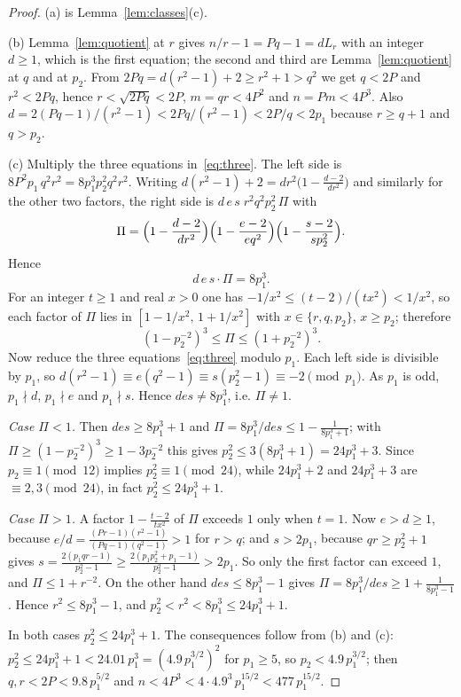 \documentclass[11pt]{amsart}
\theoremstyle{definition}
\theoremstyle{remark}
\begin{document}
\begin{proof}
(a) is Lemma~\ref{lem:classes}(c).

(b) Lemma~\ref{lem:quotient} at $r$ gives $n/r-1=Pq-1=dL_r$ with an integer $d\ge1$, which is the first equation; the second and third are Lemma~\ref{lem:quotient} at $q$ and at $p_2$. From $2Pq=d(r^2-1)+2\ge r^2+1>q^2$ we get $q<2P$ and $r^2<2Pq$, hence $r<\sqrt{2Pq}<2P$, $m=qr<4P^2$ and $n=Pm<4P^3$. Also $d=2(Pq-1)/(r^2-1)<2Pq/(r^2-1)<2P/q<2p_1$ because $r\ge q+1$ and $q>p_2$.

(c) Multiply the three equations in~\eqref{eq:three}. The left side is $8P^2p_1\,q^2r^2=8p_1^3p_2^2q^2r^2$. Writing $d(r^2-1)+2=dr^2\bigl(1-\tfrac{d-2}{dr^2}\bigr)$ and similarly for the other two factors, the right side is $d\,e\,s\;r^2q^2p_2^2\,\Pi$ with
\[
\Pi=\Bigl(1-\frac{d-2}{dr^2}\Bigr)\Bigl(1-\frac{e-2}{eq^2}\Bigr)\Bigl(1-\frac{s-2}{sp_2^2}\Bigr).
\]
Hence
\begin{equation}\label{eq:des}
d\,e\,s\cdot\Pi=8p_1^3 .
\end{equation}
For an integer $t\ge1$ and real $x>0$ one has $-1/x^2\le (t-2)/(tx^2)<1/x^2$, so each factor of $\Pi$ lies in $[1-1/x^2,\,1+1/x^2]$ with $x\in\{r,q,p_2\}$, $x\ge p_2$; therefore
\begin{equation}\label{eq:Pi}
(1-p_2^{-2})^3\le\Pi\le(1+p_2^{-2})^3 .
\end{equation}
Now reduce the three equations~\eqref{eq:three} modulo $p_1$. Each left side is divisible by $p_1$, so $d(r^2-1)\equiv e(q^2-1)\equiv s(p_2^2-1)\equiv-2\pmod{p_1}$. As $p_1$ is odd, $p_1\nmid d$, $p_1\nmid e$ and $p_1\nmid s$. Hence $des\ne8p_1^3$, i.e. $\Pi\ne1$.

\emph{Case $\Pi<1$.} Then $des\ge8p_1^3+1$ and $\Pi=8p_1^3/des\le1-\frac1{8p_1^3+1}$; with $\Pi\ge(1-p_2^{-2})^3\ge1-3p_2^{-2}$ this gives $p_2^2\le3(8p_1^3+1)=24p_1^3+3$. Since $p_2\equiv1\pmod{12}$ implies $p_2^2\equiv1\pmod{24}$, while $24p_1^3+2$ and $24p_1^3+3$ are $\equiv2,3\pmod{24}$, in fact $p_2^2\le24p_1^3+1$.

\emph{Case $\Pi>1$.} A factor $1-\frac{t-2}{tx^2}$ of $\Pi$ exceeds $1$ only when $t=1$. Now $e>d\ge1$, because $e/d=\frac{(Pr-1)(r^2-1)}{(Pq-1)(q^2-1)}>1$ for $r>q$; and $s>2p_1$, because $qr\ge p_2^2+1$ gives $s=\frac{2(p_1qr-1)}{p_2^2-1}\ge\frac{2(p_1p_2^2+p_1-1)}{p_2^2-1}>2p_1$. So only the first factor can exceed $1$, and $\Pi\le1+r^{-2}$. On the other hand $des\le8p_1^3-1$ gives $\Pi=8p_1^3/des\ge1+\frac1{8p_1^3-1}$. Hence $r^2\le8p_1^3-1$, and $p_2^2<r^2<8p_1^3\le24p_1^3+1$.

In both cases $p_2^2\le24p_1^3+1$. The consequences follow from (b) and (c): $p_2^2\le24p_1^3+1<24.01\,p_1^3=(4.9\,p_1^{3/2})^2$ for $p_1\ge5$, so $p_2<4.9\,p_1^{3/2}$; then $q,r<2P<9.8\,p_1^{5/2}$ and $n<4P^3<4\cdot4.9^3\,p_1^{15/2}<477\,p_1^{15/2}$.
\end{proof}
\end{document}
